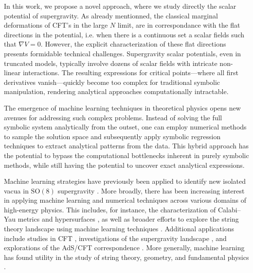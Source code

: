 \documentclass[11pt]{article}
\begin{document}
In this work, we propose a novel approach, where we study directly the scalar potential of supergravity. As already mentionned, the classical marginal deformations of CFT's in the large $N$ limit, are in correspondance with the flat directions in the potential, i.e. when there is a continuous set a scalar fields such that $\nabla V = 0$. However, the explicit characterization of these flat directions presents formidable technical challenges. Supergravity scalar potentials, even in truncated models, typically involve dozens of scalar fields with intricate non-linear interactions. The resulting expressions for critical points—where all first derivatives vanish—quickly become too complex for traditional symbolic manipulation, rendering analytical approaches computationally intractable. 

The emergence of machine learning techniques in theoretical physics opens new avenues for addressing such complex problems. Instead of solving the full symbolic system analytically from the outset, one can employ numerical methods to sample the solution space and subsequently apply symbolic regression techniques to extract analytical patterns from the data. This hybrid approach has the potential to bypass the computational bottlenecks inherent in purely symbolic methods, while still having the potential to uncover exact analytical expressions.

Machine learning strategies have previously been applied to identify new isolated vacua in $\mathrm{SO}(8)$ supergravity \cite{Comsa:2019rcz,Berman:2022jqn}. More broadly, there has been increasing interest in applying machine learning and numerical techniques across various domains of high-energy physics. This includes, for instance, the characterization of Calabi–Yau metrics and hypersurfaces \cite{Ashmore:2019wzb,Berman:2021mcw,Larfors:2022nep,Berglund:2022gvm,Jejjala:2020wcc,Douglas:2006rr,Larfors:2021pbb,He:2018jtw}, as well as broader efforts to explore the string theory landscape using machine learning techniques \cite{He:2017aed,Carifio:2017bov,Ruehle:2017mzq}. Additional applications include studies in CFT \cite{Chen:2020dxg}, investigations of the supergravity landscape \cite{Brady:2025zzi,Krishnan:2020sfg}, and explorations of the AdS/CFT correspondence \cite{Hashimoto:2018ftp}. More generally, machine learning has found utility in the study of string theory, geometry, and fundamental physics \cite{Ruehle:2020jrk,He:2023csq,Bao:2021auj}.
\end{document}
